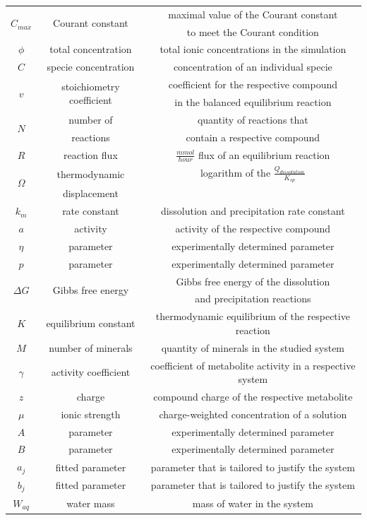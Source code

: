 \documentclass[fleqn,10pt]{wlscirep}
\begin{document}
\begin{longtable}{c|c|c}
    \multirow{2}{2em}{$C_{max}$} & \multirow{2}{3em}{Courant constant} & maximal value of the Courant constant \\& & to meet the Courant condition \\ \midrule
    $\phi$ & total concentration & total ionic concentrations in the simulation \\ \midrule
    $C$ & specie concentration & concentration of an individual specie \\ \midrule
    \multirow{2}{1em}{$v$} & \multirow{2}{3em}{stoichiometry coefficient} & coefficient for the respective compound \\& & in the balanced equilibrium reaction \\ \midrule
    \multirow{2}{1em}{$N$} & number of & quantity of reactions that \\& reactions & contain a respective compound \\ \midrule
    $R$ & reaction flux & $\frac{mmol}{hour}$ flux of an equilibrium reaction \\ \midrule
    \multirow{2}{1em}{$\Omega$} & thermodynamic & logarithm of the $\frac{Q_{dissolution}}{K_{sp}}$ \\& displacement & \\ \midrule
    $k_m$ & rate constant & dissolution and precipitation rate constant \\ \midrule
    $a$ & activity & activity of the respective compound \\ \midrule
    $\eta$ & parameter & experimentally determined parameter \\ \midrule
    $p$ & parameter & experimentally determined parameter \\ \midrule
    \multirow{2}{2em}{$\Delta G$} & \multirow{2}{5em}{Gibbs free energy} & Gibbs free energy of the dissolution \\& & and precipitation reactions \\ \midrule
    $K$ & equilibrium constant & thermodynamic equilibrium of the respective reaction \\ \midrule
    $M$ & number of minerals & quantity of minerals in the studied system \\ \midrule
    $\gamma$ & activity coefficient & coefficient of metabolite activity in a respective system \\ \midrule
    $z$ & charge & compound charge of the respective metabolite \\ \midrule
    $\mu$ & ionic strength & charge-weighted concentration of a solution \\ \midrule
    $A$ & parameter & experimentally determined parameter \\ \midrule
    $B$ & parameter & experimentally determined parameter \\ \midrule
    $a_j$ & fitted parameter & parameter that is tailored to justify the system \\ \midrule
    $b_j$ & fitted parameter & parameter that is tailored to justify the system \\ \midrule
    $W_{aq}$ & water mass & mass of water in the system \\ \bottomrule
\end{longtable} 
\end{document}
